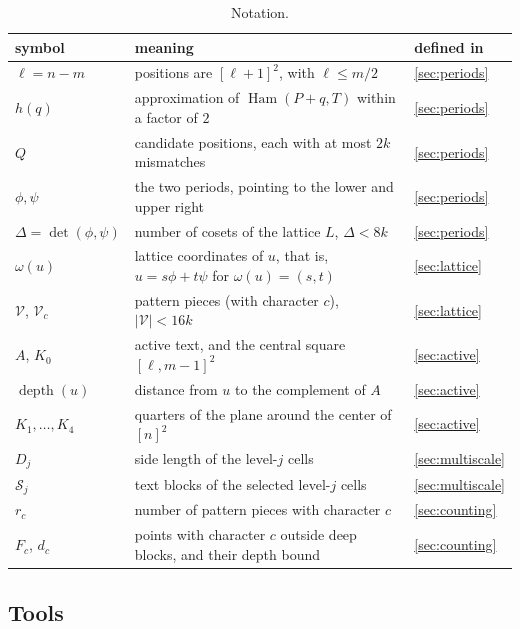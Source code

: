 \documentclass[11pt]{article}
\theoremstyle{definition}
\DeclareMathOperator{\Ham}{Ham}
\DeclareMathOperator{\depth}{depth}
\newcommand{\cS}{\mathcal{S}}
\newcommand{\cV}{\mathcal{V}}
\newcommand{\abs}[1]{\lvert #1 \rvert}
\begin{document}
\begin{table}[ht]
  \centering
  \renewcommand{\arraystretch}{1.2}
  \begin{tabular}{@{}lll@{}}
    \toprule
    symbol & meaning & defined in \\
    \midrule
    $\ell = n - m$ & positions are $[\ell+1]^2$, with $\ell \le m/2$ & \autoref{sec:periods} \\
    $h(q)$ & approximation of $\Ham(P+q,T)$ within a factor of $2$ & \autoref{sec:periods} \\
    $Q$ & candidate positions, each with at most $2k$ mismatches & \autoref{sec:periods} \\
    $\phi, \psi$ & the two periods, pointing to the lower and upper right & \autoref{sec:periods} \\
    $\Delta = \det(\phi,\psi)$ & number of cosets of the lattice $L$, $\Delta < 8k$ & \autoref{sec:periods} \\
    $\omega(u)$ & lattice coordinates of $u$, that is, $u = s\phi + t\psi$ for $\omega(u) = (s,t)$ & \autoref{sec:lattice} \\
    $\cV$, $\cV_c$ & pattern pieces (with character $c$), $\abs{\cV} < 16k$ & \autoref{sec:lattice} \\
    $A$, $K_0$ & active text, and the central square $[\ell, m-1]^2$ & \autoref{sec:active} \\
    $\depth(u)$ & distance from $u$ to the complement of $A$ & \autoref{sec:active} \\
    $K_1, \dots, K_4$ & quarters of the plane around the center of $[n]^2$ & \autoref{sec:active} \\
    $D_j$ & side length of the level-$j$ cells & \autoref{sec:multiscale} \\
    $\cS_j$ & text blocks of the selected level-$j$ cells & \autoref{sec:multiscale} \\
    $r_c$ & number of pattern pieces with character $c$ & \autoref{sec:counting} \\
    $F_c$, $d_c$ & points with character $c$ outside deep blocks, and their depth bound & \autoref{sec:counting} \\
    \bottomrule
  \end{tabular}
  \caption{Notation.}
  \label{tab:notation}
\end{table}

\subsection{Tools}
\end{document}
